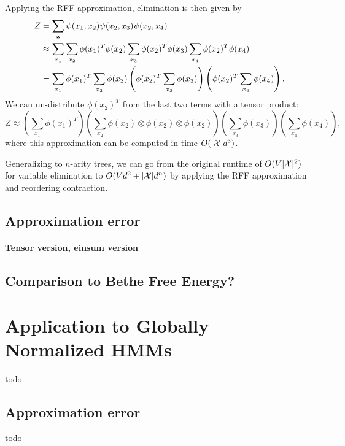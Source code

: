 \documentclass{article}
\begin{document}
Applying the RFF approximation, elimination is then given by
\begin{equation}
\begin{aligned}
Z &= \sum_{\mathbf{z}} \psi(x_1, x_2) \psi(x_2, x_3) \psi(x_2, x_4) \\
&\approx \sum_{x_1} \sum_{x_2} \phi(x_1)^T\phi(x_2)
    \sum_{x_3} \phi(x_2)^T\phi(x_3) \sum_{x_4} \phi(x_2)^T\phi(x_4)\\
&= \sum_{x_1} \phi(x_1)^T \sum_{x_2} \phi(x_2)
    \left(\phi(x_2)^T \sum_{x_3} \phi(x_3)\right)
    \left(\phi(x_2)^T\sum_{x_4} \phi(x_4)\right).
\end{aligned}
\end{equation}
We can un-distribute $\phi(x_2)^T$ from the last two terms with a tensor product:
\begin{equation}
Z \approx \left(\sum_{x_1} \phi(x_1)^T \right)
\left(\sum_{x_2} \phi(x_2) \otimes\phi(x_2) \otimes \phi(x_2)  \right)
\left(\sum_{x_3} \phi(x_3)\right) 
\left(\sum_{x_4} \phi(x_4)\right),
\end{equation}
where this approximation can be computed in time $O(|\mathcal{X}|d^3)$.

Generalizing to $n$-arity trees, we can go from the original runtime of $O(V|\mathcal{X}|^2)$
for variable elimination to $O(Vd^2 + |\mathcal{X}|d^n)$ by applying the
RFF approximation and reordering contraction.

\subsection{Approximation error}

\paragraph{Tensor version, einsum version}

\subsection{Comparison to Bethe Free Energy?}

\section{Application to Globally Normalized HMMs}
todo

\subsection{Approximation error}
todo



\end{document}
